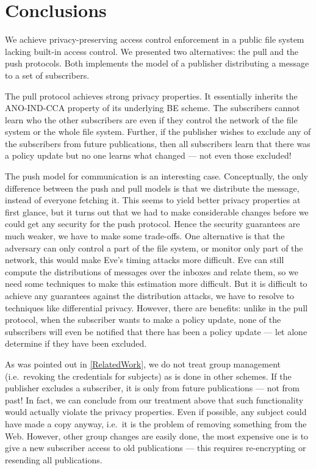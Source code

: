 \section{Conclusions}\label{Conclusions}

We achieve privacy-preserving access control enforcement in a public file 
system lacking built-in access control.
We presented two alternatives: the pull and the push protocols.
Both implements the model of a publisher distributing a message to a set of 
subscribers.

The pull protocol achieves strong privacy properties.
It essentially inherits the ANO-IND-CCA property of its underlying \ac{BE} 
scheme.
The subscribers cannot learn who the other subscribers are even if they control 
the network of the file system or the whole file system.
Further, if the publisher wishes to exclude any of the subscribers from future 
publications, then all subscribers learn that there was a policy update but no 
one learns what changed --- not even those excluded!

The push model for communication is an interesting case.
Conceptually, the only difference between the push and pull models is that we 
distribute the message, instead of everyone fetching it.
This seems to yield better privacy properties at first glance, but it turns out
that we had to make considerable changes before we could get any security for 
the push protocol.
Hence the security guarantees are much weaker, we have to make some trade-offs.
One alternative is that the adversary can only control a part of the file 
system, or monitor only part of the network, this would make Eve's timing 
attacks more difficult.
Eve can still compute the distributions of messages over the inboxes and relate 
them, so we need some techniques to make this estimation more difficult.
But it is difficult to achieve any guarantees against the distribution attacks, 
we have to resolve to techniques like differential privacy.
However, there are benefits: unlike in the pull protocol, when the subscriber 
wants to make a policy update, none of the subscribers will even be notified 
that there has been a policy update --- let alone determine if they have been 
excluded.

As was pointed out in \cref{RelatedWork}, we do not treat group management 
(i.e.\ revoking the credentials for subjects) as is done in other schemes.
If the publisher excludes a subscriber, it is only from future publications ---
not from past!
In fact, we can conclude from our treatment above that such functionality would 
actually violate the privacy properties.
Even if possible, any subject could have made a copy anyway, i.e.\ it is the 
problem of removing something from the Web.
However, other group changes are easily done, the most expensive one is to give
a new subscriber access to old publications --- this requires re-encrypting or 
resending all publications.

